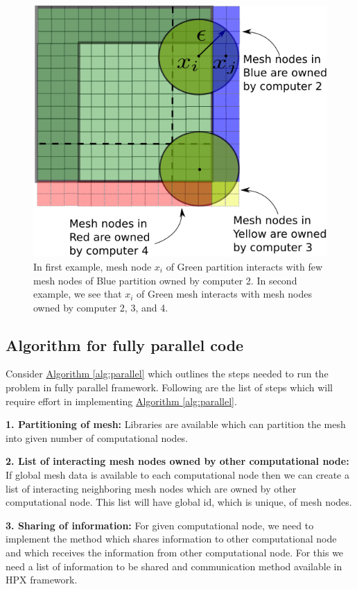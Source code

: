 \documentclass[11pt,twocolumn]{amsart}
\theoremstyle{definition}
\theoremstyle{definition}
\numberwithin{equation}{section}
\numberwithin{equation}{section}
\newcommand{\sref}[2]{\hyperref[#2]{#1 \ref*{#2}}}
\begin{document}
\begin{figure}[ht]
\centering
\includegraphics[scale=0.5]{mesh_partition_green_case_2.png}
\caption{In first example, mesh node $x_i$ of Green partition interacts with few mesh nodes of Blue partition owned by computer 2. In second example, we see that $x_i$ of Green mesh interacts with mesh nodes owned by computer 2, 3, and 4.}\label{fig:green case 2}
\end{figure}

\subsection{Algorithm for fully parallel code}
Consider \sref{Algorithm}{alg:parallel} which outlines the steps needed to run the problem in fully parallel framework. Following are the list of steps which will require effort in implementing \sref{Algorithm}{alg:parallel}.

\noindent \textbf{1. Partitioning of mesh: }Libraries are available which can partition the mesh into given number of computational nodes.

\noindent \textbf{2. List of interacting mesh nodes owned by other computational node: }If global mesh data is available to each computational node then we can create a list of interacting neighboring mesh nodes which are owned by other computational node. This list will have global id, which is unique, of mesh nodes. 

\noindent \textbf{3. Sharing of information: }For given computational node, we need to implement the method which shares information to other computational node and which receives the information from other computational node. For this we need a list of information to be shared and communication method available in HPX framework.
\end{document}
